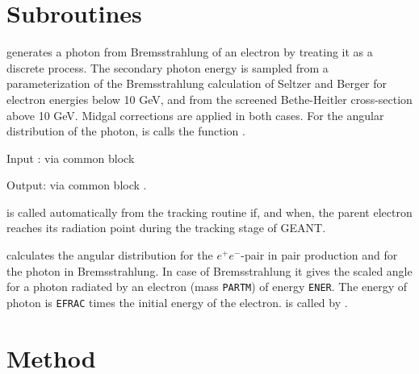 \begin{bibunit}[unsrt]
\renewcommand{\bibname}{TEMP Bibliography}
   
  

\section{Subroutines}


 generates a photon from Bremsstrahlung of an electron by
treating it as a discrete process.
The secondary photon energy is sampled from a parameterization of
the Bremsstrahlung calculation of Seltzer and Berger
\cite{bib-SEL1} for electron energies below 10 GeV, and from the screened
Bethe-Heitler cross-section above 10 GeV.
Midgal corrections are applied in both cases. 
For the angular distribution of the photon, is calls the function
.
 
Input :  via common block 
 
Output:  via common block .
 
 is called automatically from the tracking
routine  if, and when,
the parent electron reaches its radiation point during the
tracking stage of GEANT.
 

 calculates the angular distribution for the $e^+ e^-$-pair
in pair production and for the photon in Bremsstrahlung.
In case of Bremsstrahlung it gives the
scaled angle for a photon radiated by an electron (mass {\tt PARTM}) of 
energy {\tt ENER}. The energy of photon is {\tt EFRAC} times
the initial energy of the electron.
 is called by .

\section {Method}
 

\end{bibunit}
